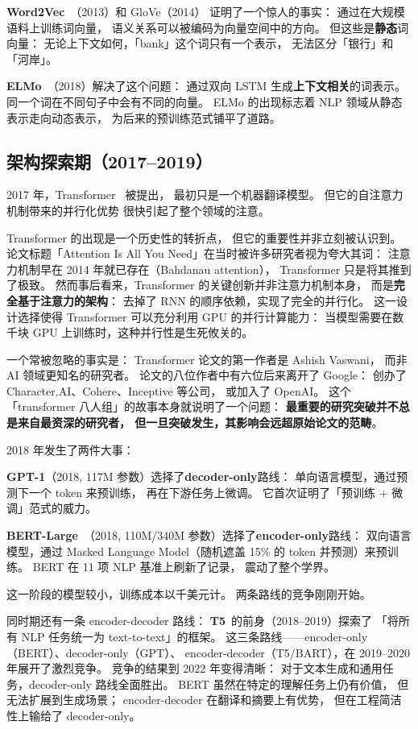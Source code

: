 \textbf{Word2Vec}~\cite{mikolov2013word2vec}（2013）和 GloVe（2014）
证明了一个惊人的事实：
通过在大规模语料上训练词向量，
语义关系可以被编码为向量空间中的方向。
但这些是\textbf{静态}词向量：
无论上下文如何，「bank」这个词只有一个表示，
无法区分「银行」和「河岸」。

\textbf{ELMo}~\cite{peters2018elmo}（2018）解决了这个问题：
通过双向 LSTM 生成\textbf{上下文相关}的词表示。
同一个词在不同句子中会有不同的向量。
ELMo 的出现标志着 NLP 领域从静态表示走向动态表示，
为后来的预训练范式铺平了道路。

\subsection{架构探索期（2017--2019）}

2017 年，Transformer~\cite{vaswani2017attention} 被提出，
最初只是一个机器翻译模型。
但它的自注意力机制带来的并行化优势
很快引起了整个领域的注意。

Transformer 的出现是一个历史性的转折点，
但它的重要性并非立刻被认识到。
论文标题「Attention Is All You Need」在当时被许多研究者视为夸大其词：
注意力机制早在 2014 年就已存在（Bahdanau attention），
Transformer 只是将其推到了极致。
然而事后看来，Transformer 的关键创新并非注意力机制本身，
而是\textbf{完全基于注意力的架构}：
去掉了 RNN 的顺序依赖，实现了完全的并行化。
这一设计选择使得 Transformer 可以充分利用 GPU 的并行计算能力：
当模型需要在数千块 GPU 上训练时，这种并行性是生死攸关的。

一个常被忽略的事实是：
Transformer 论文的第一作者是 Ashish Vaswani，
而非 AI 领域更知名的研究者。
论文的八位作者中有六位后来离开了 Google：
创办了 Character.AI、Cohere、Inceptive 等公司，
或加入了 OpenAI。
这个「transformer 八人组」的故事本身就说明了一个问题：
\textbf{最重要的研究突破并不总是来自最资深的研究者，
但一旦突破发生，其影响会远超原始论文的范畴}。

2018 年发生了两件大事：

\textbf{GPT-1}（2018, 117M 参数）选择了\textbf{decoder-only}路线：
单向语言模型，通过预测下一个 token 来预训练，
再在下游任务上微调。
它首次证明了「预训练 + 微调」范式的威力。

\textbf{BERT-Large}~\cite{devlin2019bert}（2018, 110M/340M 参数）选择了\textbf{encoder-only}路线：
双向语言模型，通过 Masked Language Model（随机遮盖 15\% 的 token 并预测）来预训练。
BERT 在 11 项 NLP 基准上刷新了记录，
震动了整个学界。

这一阶段的模型较小，训练成本以千美元计。
两条路线的竞争刚刚开始。

同时期还有一条 encoder-decoder 路线：
\textbf{T5}~的前身（2018--2019）探索了
「将所有 NLP 任务统一为 text-to-text」的框架。
这三条路线——encoder-only（BERT）、decoder-only（GPT）、
encoder-decoder（T5/BART），在 2019--2020 年展开了激烈竞争。
竞争的结果到 2022 年变得清晰：
对于文本生成和通用任务，decoder-only 路线全面胜出。
BERT 虽然在特定的理解任务上仍有价值，
但无法扩展到生成场景；
encoder-decoder 在翻译和摘要上有优势，
但在工程简洁性上输给了 decoder-only。

